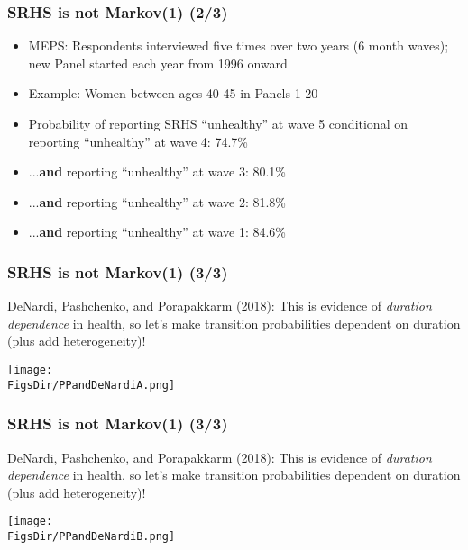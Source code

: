 \documentclass[aspectratio=169]{beamer}
\newcommand{\FigsDir}{../Figures}
\begin{document}
\begin{frame}\frametitle{SRHS is not Markov(1) (2/3)}
\begin{itemize}
	\item <1->MEPS: Respondents interviewed five times over two years (6 month waves); new Panel started each year from 1996 onward
	
	\item <1->Example: Women between ages 40-45 in Panels 1-20
	
	\item <2->Probability of reporting SRHS ``unhealthy'' at wave 5 conditional on reporting ``unhealthy'' at wave 4: 74.7\%
	
	\item <3->...\textbf{and} reporting ``unhealthy'' at wave 3: 80.1\%
	
	\item <4->...\textbf{and} reporting ``unhealthy'' at wave 2: 81.8\%
	
	\item <5->...\textbf{and} reporting ``unhealthy'' at wave 1: 84.6\%
\end{itemize}
\end{frame}


\begin{frame}\frametitle{SRHS is not Markov(1) (3/3)}
DeNardi, Pashchenko, and Porapakkarm (2018): This is evidence of \textit{duration dependence} in health, so let's make transition probabilities dependent on duration (plus add heterogeneity)!
\begin{center}
	\texttt{[image: \\FigsDir/PPandDeNardiA.png]}
\end{center}
\end{frame}


\begin{frame}\frametitle{SRHS is not Markov(1) (3/3)}
DeNardi, Pashchenko, and Porapakkarm (2018): This is evidence of \textit{duration dependence} in health, so let's make transition probabilities dependent on duration (plus add heterogeneity)!
\begin{center}
	\texttt{[image: \\FigsDir/PPandDeNardiB.png]}
\end{center}
\end{frame}
\end{document}
